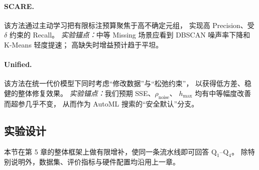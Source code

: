 \documentclass[10pt]{article} %
\numberwithin{equation}{section}
\begin{document}
\paragraph{SCARE\cite{10.1145/2463676.2463706}.}
该方法通过主动学习把有限标注预算聚焦于高不确定元组，
实现高 Precision、受 $\delta$ 约束的 Recall。  
\emph{实验锚点：}中等 Missing 场景应看到
DBSCAN 噪声率下降和 K-Means 轻度提速；
高缺失时增益预计趋于平坦。

\paragraph{Unified\cite{5767833}.}
该方法在统一代价模型下同时考虑“修改数据”与“松弛约束”，
以获得低方差、稳健的整体修复效果。  
\emph{实验锚点：}我们预期 SSE、$\rho_{\text{noise}}$、
$h_{\max}$ 均有中等幅度改善而超参几乎不变，
从而作为 AutoML 搜索的“安全默认”分支。

\subsection{实验设计}
\label{sec:exp_design}

本节在第 5 章的整体框架上做有限增补，使同一条流水线即可回答
\(\mathrm{Q_1}\)--\(\mathrm{Q_4}\)。
除特别说明外，数据集、评价指标与硬件配置均沿用上一章。
\end{document}
